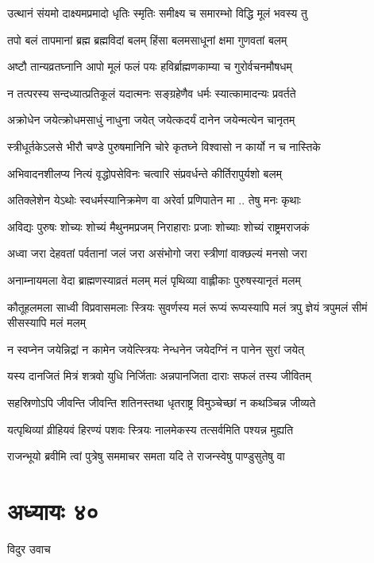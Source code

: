 \twolineshloka
{उत्थानं संयमो दाक्ष्यमप्रमादो धृतिः स्मृतिः}
{समीक्ष्य च समारम्भो विद्धि मूलं भवस्य तु}


\twolineshloka
{तपो बलं तापमानां ब्रह्म ब्रह्मविदां बलम्}
{हिंसा बलमसाधूनां क्षमा गुणवतां बलम्}


\twolineshloka
{अष्टौ तान्यव्रतघ्नानि आपो मूलं फलं पयः}
{हविर्ब्राह्मणकाम्या च गुरोर्वचनमौषधम्}


\twolineshloka
{न तत्परस्य सन्दध्यात्प्रतिकूलं यदात्मनः}
{सङ्ग्रहेणैव धर्मः स्यात्कामादन्यः प्रवर्तते}


\twolineshloka
{अक्रोधेन जयेत्क्रोधमसाधुं नाधुना जयेत्}
{जयेत्कदर्यं दानेन जयेन्मत्येन चानृतम्}


\twolineshloka
{स्त्रीधूर्तकेऽलसे भीरौ चण्डे पुरुषमानिनि}
{चोरे कृतघ्ने विश्वासो न कार्यो न च नास्तिके}


\twolineshloka
{अभिवादनशीलप्य नित्यं वृद्धोपसेविनः}
{चत्वारि संप्रवर्धन्ते कीर्तिरापुर्यशो बलम्}


\twolineshloka
{अतिक्लेशेन येऽथोः स्वधर्मस्यानिक्रमेण वा}
{अरेर्वा प्रणिपातेन मा .. तेषु मनः कृथाः}


\twolineshloka
{अविद्यः पुरुषः शोच्यः शोच्यं मैथुनमप्रजम्}
{निराहाराः प्रजाः शोच्याः शोच्यं राष्ट्रमराजकं}


\twolineshloka
{अध्वा जरा देहवतां पर्वतानां जलं जरा}
{असंभोगो जरा स्त्रीणां वाक्छल्यं मनसो जरा}


\twolineshloka
{अनाम्नायमला वेदा ब्राह्मणस्याव्रतं मलम्}
{मलं पृथिव्या वाह्लीकाः पुरुषस्यानृतं मलम्}


कौतूहलमला साध्वी विप्रवासमलाः स्त्रियः
\twolineshloka
{सुवर्णस्य मलं रूप्यं रूप्यस्यापि मलं त्रपु}
{ज्ञेयं त्रपुमलं सीमं सीसस्यापि मलं मलम्}


\twolineshloka
{न स्वप्नेन जयेन्निद्रां न कामेन जयेत्स्त्रियः}
{नेन्धनेन जयेदग्निं न पानेन सुरां जयेत्}


\twolineshloka
{यस्य दानजितं मित्रं शत्रवो युधि निर्जिताः}
{अन्नपानजिता दाराः सफलं तस्य जीवितम्}


\twolineshloka
{सहस्रिणोऽपि जीवन्ति जीवन्ति शतिनस्तथा}
{धृतराष्ट्र विमुञ्चेच्छां न कथञ्चिन्न जीव्यते}


\twolineshloka
{यत्पृथिव्यां व्रीहियवं हिरण्यं पशवः स्त्रियः}
{नालमेकस्य तत्सर्वमिति पश्यन्न मुह्यति}


\twolineshloka
{राजन्भूयो ब्रवीमि त्वां पुत्रेषु सममाचर}
{समता यदि ते राजन्स्वेषु पाण्डुसुतेषु वा}


\chapter{अध्यायः ४०}
\twolineshloka
{विदुर उवाच}
{}


